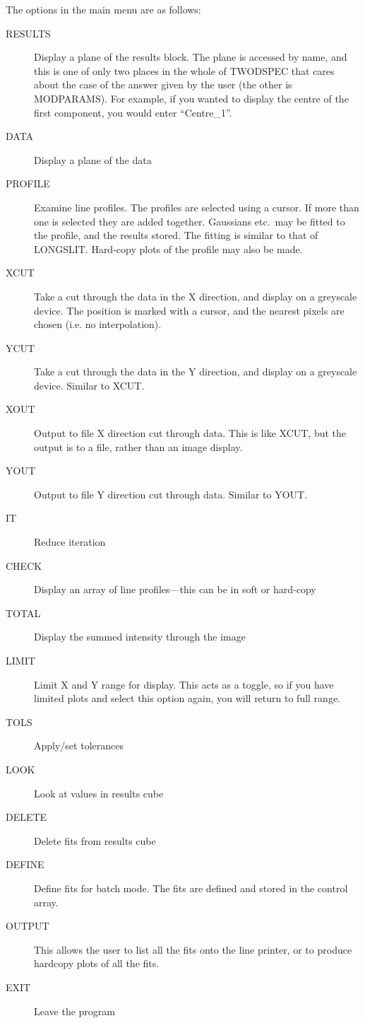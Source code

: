 The options in the main menu are as follows:
\begin{description}
\item[RESULTS] Display a plane of the results block.
The plane is accessed by name, and this is one of only two places in the
whole of TWODSPEC that cares about the case of the answer given by the
user (the other is MODPARAMS).
For example, if you wanted to display the centre of the first component,
you would enter ``Centre\_1''.
\item[DATA] Display a plane of the data
\item[PROFILE] Examine line profiles.
The profiles are selected using a cursor.
If more than one is selected they are added together. Gaussians  etc.\
may be fitted to the profile, and the results stored.
The fitting is similar to that of LONGSLIT.
Hard-copy plots of the profile may also be made.
\item[XCUT] Take a cut through the data in the X direction, and
display on a greyscale device.
The position is marked with a cursor, and the nearest pixels are chosen
(i.e. no interpolation).
\item[YCUT] Take a cut through the data in the Y direction, and
display on a greyscale device.
Similar to XCUT.
\item[XOUT] Output to file X direction cut through data.
This is like XCUT, but the output is to a file, rather than an image
display.
\item[YOUT] Output to file Y direction cut through data.
Similar to YOUT.
\item[IT] Reduce iteration
\item[CHECK] Display an array of line profiles---this can be in soft
or hard-copy
\item[TOTAL] Display the summed intensity through the image
\item[LIMIT] Limit X and Y range for display.
This acts as a toggle, so if you have limited plots and select this
option again, you will return to full range.
\item[TOLS] Apply/set tolerances
\item[LOOK] Look at values in results cube
\item[DELETE] Delete fits from results cube
\item[DEFINE] Define fits for batch mode. The fits are defined and
stored in the control array.
\item[OUTPUT] This allows the user to list all the fits onto the
line printer, or to produce hardcopy plots of all the fits.
\item[EXIT] Leave the program

\end{description}
